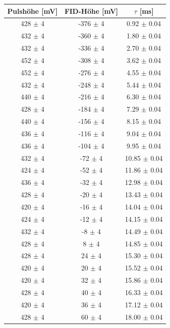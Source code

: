 \documentclass[12pt,a4paper]{article}
\begin{document}
\begin{table}
\centering
\begin{tabular}{|c|c|c|}
\hline 
Pulshöhe [mV] & FID-Höhe [mV] & $\tau$ [ms] \\ 
\hline 
428 $\pm$ 4 & -376 $\pm$ 4 & 0.92 $\pm$ 0.04 \\ 
\hline
432 $\pm$ 4 & -360 $\pm$ 4 & 1.80 $\pm$ 0.04 \\ 
\hline 
432 $\pm$ 4 & -336 $\pm$ 4 & 2.70 $\pm$ 0.04 \\ 
\hline 
452 $\pm$ 4 & -308 $\pm$ 4 & 3.62 $\pm$ 0.04 \\ 
\hline 
452 $\pm$ 4 & -276 $\pm$ 4 & 4.55 $\pm$ 0.04 \\ 
\hline
432 $\pm$ 4 & -248 $\pm$ 4 & 5.44 $\pm$ 0.04 \\ 
\hline 
440 $\pm$ 4 & -216 $\pm$ 4 & 6.30 $\pm$ 0.04 \\ 
\hline 
428 $\pm$ 4 & -184 $\pm$ 4 & 7.29 $\pm$ 0.04 \\ 
\hline 
440 $\pm$ 4 & -156 $\pm$ 4 & 8.15 $\pm$ 0.04 \\ 
\hline 
436 $\pm$ 4 & -116 $\pm$ 4 & 9.04 $\pm$ 0.04 \\ 
\hline
436 $\pm$ 4 & -104 $\pm$ 4 & 9.95 $\pm$ 0.04 \\ 
\hline 
432 $\pm$ 4 & -72 $\pm$ 4 & 10.85 $\pm$ 0.04 \\ 
\hline 
424 $\pm$ 4 & -52 $\pm$ 4 & 11.86 $\pm$ 0.04 \\ 
\hline 
436 $\pm$ 4 & -32 $\pm$ 4 & 12.98 $\pm$ 0.04 \\ 
\hline
428 $\pm$ 4 & -20 $\pm$ 4 & 13.43 $\pm$ 0.04 \\ 
\hline 
420 $\pm$ 4 & -16 $\pm$ 4 & 14.04 $\pm$ 0.04 \\ 
\hline 
424 $\pm$ 4 & -12 $\pm$ 4 & 14.15 $\pm$ 0.04 \\ 
\hline 
432 $\pm$ 4 & -8 $\pm$ 4 & 14.49 $\pm$ 0.04 \\ 
\hline 
428 $\pm$ 4 & 8 $\pm$ 4 & 14.85 $\pm$ 0.04 \\ 
\hline 
428 $\pm$ 4 & 24 $\pm$ 4 & 15.30 $\pm$ 0.04 \\ 
\hline 
420 $\pm$ 4 & 20 $\pm$ 4 & 15.52 $\pm$ 0.04 \\ 
\hline 
420 $\pm$ 4 & 32 $\pm$ 4 & 15.86 $\pm$ 0.04 \\ 
\hline 
428 $\pm$ 4 & 40 $\pm$ 4 & 16.33 $\pm$ 0.04 \\ 
\hline 
420 $\pm$ 4 & 36 $\pm$ 4 & 17.12 $\pm$ 0.04 \\ 
\hline 
428 $\pm$ 4 & 60 $\pm$ 4 & 18.00 $\pm$ 0.04 \\ 

\end{tabular}
\end{table}
\end{document}
